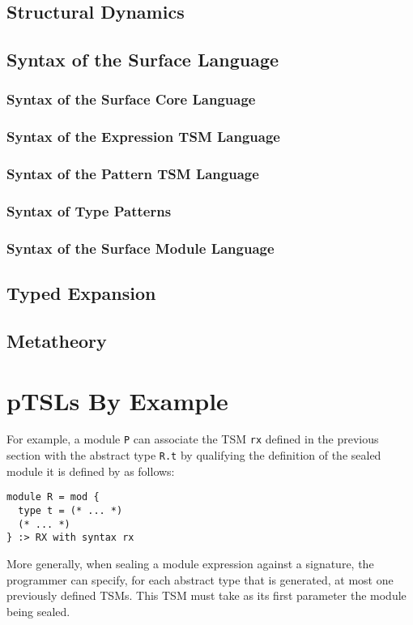 \subsection{Structural Dynamics}
\subsection{Syntax of the Surface Language}
\subsubsection{Syntax of the Surface Core Language}
\subsubsection{Syntax of the Expression TSM Language}
\subsubsection{Syntax of the Pattern TSM Language}
\subsubsection{Syntax of Type Patterns}
\subsubsection{Syntax of the Surface Module Language}

\subsection{Typed Expansion}
\subsection{Metatheory}

\section{pTSLs By Example}
For example, a module \lstinline{P} can associate the TSM \lstinline{rx} defined in the previous section with the abstract type \lstinline{R.t} by qualifying the definition of the sealed module it is defined by as follows:
\begin{lstlisting}[numbers=none]
module R = mod {
  type t = (* ... *)
  (* ... *)
} :> RX with syntax rx
\end{lstlisting}
More generally, when sealing a module expression against a signature, the programmer can specify, for each abstract type that is generated, at most one previously defined TSMs. This TSM must take as its first parameter the module being sealed.

